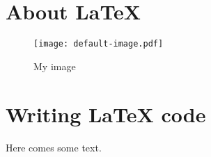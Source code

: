 \usepackage{hyperref}

\tableofcontents

\section{About {\LaTeX}}

\begin{figure}[H]
	\centering\texttt{[image: default-image.pdf]}
	\caption{My image}
\end{figure}

\section{Writing {\LaTeX} code}
Here comes some text.

\listoffigures
{}
